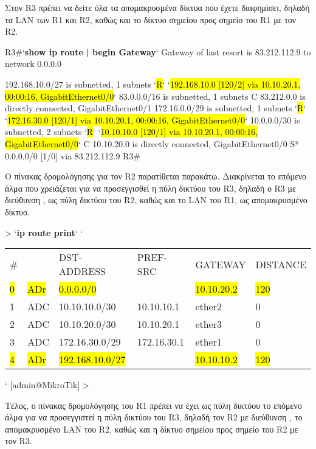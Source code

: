 \documentclass{EdipyLabs} %
\begin{document}
Στον R3 πρέπει να δείτε όλα τα απομακρυσμένα δίκτυα που έχετε διαφημίσει, δηλαδή τα LAN των R1 και R2, καθώς και το δίκτυο σημείου προς σημείο του R1 με τον R2.
\begin{CommandBox}
R3#`\textbf{show ip route | begin Gateway}`
Gateway of last resort is 83.212.112.9 to network 0.0.0.0

	192.168.10.0/27 is subnetted, 1 subnets
`\hl{R}`	  `\hl{192.168.10.0 [120/2] via 10.10.20.1, 00:00:16, GigabitEthernet0/0}`
	83.0.0.0/16 is subnetted, 1 subnets
C	  83.212.0.0 is directly connected, GigabitEthernet0/1
	172.16.0.0/29 is subnetted, 1 subnets
`\hl{R}`	  `\hl{172.16.30.0 [120/1] via 10.10.20.1, 00:00:16, GigabitEthernet0/0}`
	10.0.0.0/30 is subnetted, 2 subnets
`\hl{R}`	  `\hl{10.10.10.0 [120/1] via 10.10.20.1, 00:00:16, GigabitEthernet0/0}`
C	10.10.20.0 is directly connected, GigabitEthernet0/0
S*  0.0.0.0/0 [1/0] via 83.212.112.9
R3#
\end{CommandBox}

Ο πίνακας δρομολόγησης για τον R2 παρατίθεται παρακάτω. Διακρίνεται το επόμενο άλμα που χρειάζεται για να προσεγγισθεί η πύλη δικτύου του R3, δηλαδή ο R3 με διεύθυνση , ως πύλη δικτύου του R2, καθώς και το LAN του R1, ως απομακρυσμένο δίκτυο.

\begin{CommandBox}
[admin@R2] > `\textbf{ip route print}`
`\begin{tabular}{llllll}
	\#&   &   DST-ADDRESS&        PREF-SRC&        GATEWAY&            DISTANCE\\
	\hl{0}& \hl{ADr}&  \hl{0.0.0.0/0}&                   &       \hl{10.10.20.2}&              \hl{120}\\
	1& ADC&  10.10.10.0/30&      10.10.10.1&      ether2&                    0\\		
	2& ADC&  10.10.20.0/30&      10.10.20.1&      ether3&                    0\\
	3& ADC&  172.16.30.0/29&     172.16.30.1&     ether1&                    0\\
	\hl{4}& \hl{ADr}&  \hl{192.168.10.0/27}&               &     \hl{10.10.10.2}&              \hl{120}
\end{tabular}`
[admin@MikroTik] >
\end{CommandBox}

Τέλος, ο πίνακας δρομολόγησης του R1 πρέπει να έχει ως πύλη δικτύου το επόμενο άλμα για να προσεγγιστεί η πύλη δικτύου του R3, δηλαδή τον R2 με διεύθυνση  , το απομακρυσμένο LAN του R2, καθώς και η δίκτυο σημείου προς σημείο του R2 με τον R3.
\end{document}

